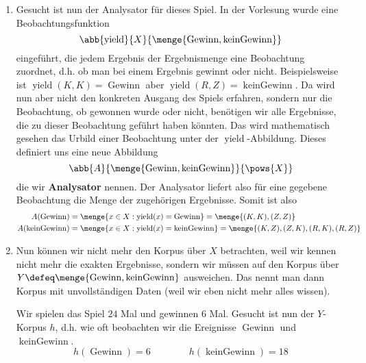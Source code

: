 \documentclass[ngerman, a4paper, 12pt]{article}
\newcommand{\begriff}[1]{\textbf{#1}}
\DeclareMathOperator{\yield}{yield}
\DeclareMathOperator{\win}{Gewinn}
\DeclareMathOperator{\nowin}{kein Gewinn}
\begin{document}
\begin{enumerate}[label=(\alph*), leftmargin=0pt]
	\item
	Gesucht ist nun der Analysator für dieses Spiel. In der Vorlesung wurde eine Beobachtungsfunktion
	\begin{equation*}
		\abb{\yield}{X}{\menge{\win, \nowin}}
	\end{equation*} 
	eingeführt, die jedem Ergebnis der Ergebnismenge eine Beobachtung zuordnet, d.h. ob man bei einem Ergebnis gewinnt oder nicht. Beispielsweise ist $\yield(K,K) = \win$ aber $\yield(R,Z) = \nowin$.
	Da wird nun aber nicht den konkreten Ausgang des Spiels erfahren, sondern nur die Beobachtung, ob gewonnen wurde oder nicht, benötigen wir alle Ergebnisse, die zu dieser Beobachtung geführt haben könnten. Das wird mathematisch gesehen das Urbild einer Beobachtung unter der $\yield$-Abbildung. Dieses definiert uns eine neue Abbildung 
	\begin{equation*}
		\abb{A}{\menge{\win, \nowin}}{\pows{X}}
	\end{equation*} 
	die wir \begriff{Analysator} nennen. Der Analysator liefert also für eine gegebene Beobachtung die Menge der zugehörigen Ergebnisse.
	Somit ist also
	\begin{equation*}
		\begin{aligned}
		A(\win) &= \menge{x \in X: \yield(x) = \win} = \menge{(K,K), (Z,Z)} \\
		A(\nowin) &= \menge{x \in X: \yield(x) = \nowin} = \menge{(K,Z), (Z,K),(R,K),(R,Z)}
		\end{aligned}
	\end{equation*}
	
	\item
	Nun können wir nicht mehr den Korpus über $X$ betrachten, weil wir kennen nicht mehr die exakten Ergebnisse, sondern wir müssen auf den Korpus über $Y \defeq \menge{\win, \nowin}$ ausweichen. Das nennt man dann Korpus mit unvollständigen Daten (weil wir eben nicht mehr alles wissen).
	
	Wir spielen das Spiel $24$ Mal und gewinnen $6$ Mal. Gesucht ist nun der $Y$-Korpus $h$, d.h. wie oft beobachten wir die Ereignisse $\win$ und $\nowin$.
	\begin{equation*}
		h(\win) = 6 \qquad\qquad h(\nowin) = 18
	\end{equation*}
	
	

\end{enumerate}
\end{document}
